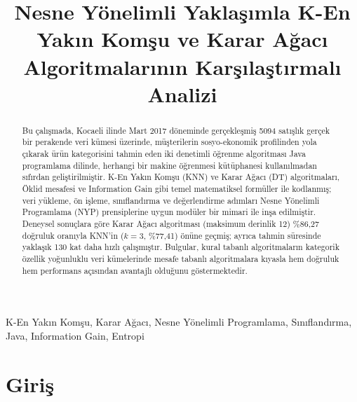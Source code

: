 \documentclass[conference]{IEEEtran}
\begin{document}
\title{Nesne Yönelimli Yaklaşımla K-En Yakın Komşu ve Karar Ağacı Algoritmalarının Karşılaştırmalı Analizi}

\author{
\and
{}
}

\maketitle

\begin{abstract}
Bu çalışmada, Kocaeli ilinde Mart 2017 döneminde gerçekleşmiş 5094 satışlık gerçek bir perakende veri kümesi üzerinde, müşterilerin sosyo-ekonomik profilinden yola çıkarak ürün kategorisini tahmin eden iki denetimli öğrenme algoritması Java programlama dilinde, herhangi bir makine öğrenmesi kütüphanesi kullanılmadan sıfırdan geliştirilmiştir. K-En Yakın Komşu (KNN) ve Karar Ağacı (DT) algoritmaları, Öklid mesafesi ve Information Gain gibi temel matematiksel formüller ile kodlanmış; veri yükleme, ön işleme, sınıflandırma ve değerlendirme adımları Nesne Yönelimli Programlama (NYP) prensiplerine uygun modüler bir mimari ile inşa edilmiştir. Deneysel sonuçlara göre Karar Ağacı algoritması (maksimum derinlik 12) \%86,27 doğruluk oranıyla KNN'in ($k=3$, \%77,41) önüne geçmiş; ayrıca tahmin süresinde yaklaşık 130 kat daha hızlı çalışmıştır. Bulgular, kural tabanlı algoritmaların kategorik özellik yoğunluklu veri kümelerinde mesafe tabanlı algoritmalara kıyasla hem doğruluk hem performans açısından avantajlı olduğunu göstermektedir.
\end{abstract}

\begin{IEEEkeywords}
K-En Yakın Komşu, Karar Ağacı, Nesne Yönelimli Programlama, Sınıflandırma, Java, Information Gain, Entropi
\end{IEEEkeywords}

\section{Giriş}
\end{document}
